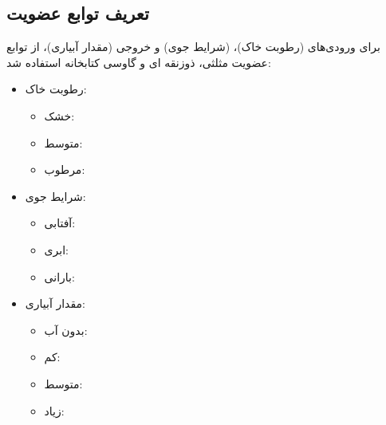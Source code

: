 \documentclass[12pt]{exam}
\begin{document}
	\subsection{تعریف توابع عضویت}
	برای ورودی‌های  (رطوبت خاک)،  (شرایط جوی) و خروجی  (مقدار آبیاری)، از توابع عضویت مثلثی، ذوزنقه ای و گاوسی کتابخانه  استفاده شد:
	\newline
	\begin{itemize}
		\item رطوبت خاک:
		\begin{itemize}
			\item خشک: 
			\item متوسط: 
			\item مرطوب: 
		\end{itemize}
		\item شرایط جوی:
		\begin{itemize}
			\item آفتابی: 
			\item ابری: 
			\item بارانی: 
		\end{itemize}
		\item مقدار آبیاری:
		\begin{itemize}
			\item بدون آب: 
			\item کم: 
			\item متوسط: 
			\item زیاد: 
		\end{itemize}
	\end{itemize}
	
	\newpage
\end{document}
